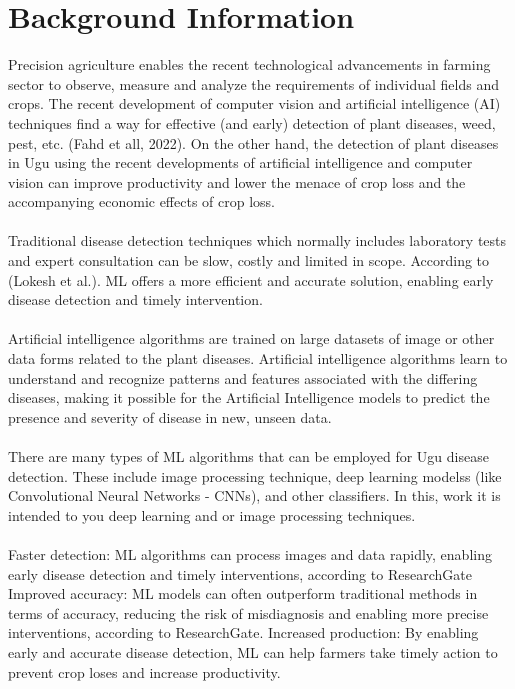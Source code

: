 \section{Background Information}
Precision agriculture enables the recent technological advancements in farming sector to observe, measure and analyze the requirements of individual fields and crops. The recent development of computer vision and artificial intelligence (AI) techniques find a way for effective (and early) detection of plant diseases, weed, pest, etc. (Fahd et all, 2022). On the other hand, the detection of plant diseases in Ugu using the recent developments of artificial intelligence and computer vision can improve productivity and lower the menace of crop loss and the accompanying economic effects of crop loss. 

\paragraph*{}Traditional disease detection techniques which normally includes laboratory tests and expert consultation can be slow, costly and limited in scope. According to (Lokesh et al.). ML offers a more efficient and accurate solution, enabling early disease detection and timely intervention.

\paragraph*{} Artificial intelligence algorithms are trained on large datasets of image or other data forms related to the plant diseases. Artificial intelligence algorithms learn to understand and recognize patterns and features associated with the differing diseases, making it possible for the Artificial Intelligence models to predict the presence and severity of disease in new, unseen data.

\paragraph*{} There are many types of ML algorithms that can be employed for Ugu disease detection. These include image processing technique, deep learning modelss (like Convolutional Neural Networks - CNNs), and other classifiers. In this, work it is intended to you deep learning and or image processing techniques. 

\paragraph*{} Faster detection: ML algorithms can process images and data rapidly, enabling early disease detection and timely interventions, according to ResearchGate Improved accuracy: ML models can often outperform traditional methods in terms of accuracy, reducing the risk of misdiagnosis and enabling more precise interventions, according to ResearchGate. Increased production: By enabling early and accurate disease detection, ML can help farmers take timely action to prevent crop loses and increase productivity. 


